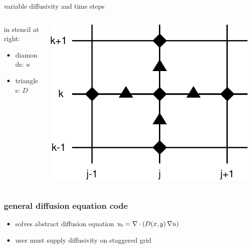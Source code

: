 \begin{frame}{variable diffusivity and time steps}
\vspace{-0.15in}
\small
\begin{columns}
\begin{column}{0.55\textwidth}
in stencil at right:
\begin{itemize}
\item[] diamonds: $u$
\item[] triangles: $D$
\end{itemize}
\end{column}
\begin{column}{0.45\textwidth}
\begin{center}
\vspace{-0.15in}
\includegraphics[width=1.0\textwidth]{photos/diffstencil}
\end{center}
\end{column}
\end{columns}
\end{frame}


\begin{frame}
  \frametitle{general diffusion equation code}


\small
\begin{itemize}
\item solves abstract diffusion equation $u_t = \nabla\cdot \left(D(x,y)\, \nabla u\right)$
\item user must supply diffusivity on staggered grid
\end{itemize}
\end{frame}


